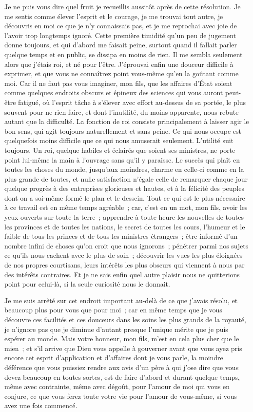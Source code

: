 \documentclass[french,twoside]{book} %
\begin{document}
Je ne puis vous dire quel fruit je recueillis aussitôt après de cette résolution. Je me sentis comme élever l’esprit et le courage, je me trouvai tout autre, je découvris en moi ce que je n’y connaissais pas, et je me reprochai avec joie de l’avoir trop longtemps ignoré. Cette première timidité qu’un peu de jugement donne toujours, et qui d’abord me faisait peine, surtout quand il fallait parler quelque temps et en public, se dissipa en moins de rien. Il me sembla seulement alors que j’étais roi, et né pour l’être. J’éprouvai enfin une douceur difficile à exprimer, et que vous ne connaîtrez point vous-même qu’en la goûtant comme moi. Car il ne faut pas vous imaginer, mon fils, que les affaires d’État soient comme quelques endroits obscurs et épineux des sciences qui vous auront peut-être fatigué, où l’esprit tâche à s’élever avec effort au-dessus de sa portée, le plus souvent pour ne rien faire, et dont l’inutilité, du moins apparente, nous rebute autant que la difficulté. La fonction de roi consiste principalement à laisser agir le bon sens, qui agit toujours naturellement et sans peine. Ce qui nous occupe est quelquefois moins difficile que ce qui nous amuserait seulement. L’utilité suit toujours. Un roi, quelque habiles et éclairés que soient ses ministres, ne porte point lui-même la main à l’ouvrage sans qu’il y paraisse. Le succès qui plaît en toutes les choses du monde, jusqu’aux moindres, charme en celle-ci comme en la plus grande de toutes, et nulle satisfaction n’égale celle de remarquer chaque jour quelque progrès à des entreprises glorieuses et hautes, et à la félicité des peuples dont on a soi-même formé le plan et le dessein. Tout ce qui est le plus nécessaire à ce travail est en même temps agréable ; car, c’est en un mot, mon fils, avoir les yeux ouverts sur toute la terre ; apprendre à toute heure les nouvelles de toutes les provinces et de toutes les nations, le secret de toutes les cours, l’humeur et le faible de tous les princes et de tous les ministres étrangers ; être informé d’un nombre infini de choses qu’on croit que nous ignorons ; pénétrer parmi nos sujets ce qu’ils nous cachent avec le plus de soin ; découvrir les vues les plus éloignées de nos propres courtisans, leurs intérêts les plus obscurs qui viennent à nous par des intérêts contraires. Et je ne sais enfin quel autre plaisir nous ne quitterions point pour celui-là, si la seule curiosité nous le donnait.\par
Je me suis arrêté sur cet endroit important au-delà de ce que j’avais résolu, et beaucoup plus pour vous que pour moi ; car en même temps que je vous découvre ces facilités et ces douceurs dans les soins les plus grands de la royauté, je n’ignore pas que je diminue d’autant presque l’unique mérite que je puis espérer au monde. Mais votre honneur, mon fils, m’est en cela plus cher que le mien ; et s’il arrive que Dieu vous appelle à gouverner avant que vous ayez pris encore cet esprit d’application et d’affaires dont je vous parle, la moindre déférence que vous puissiez rendre aux avis d’un père à qui j’ose dire que vous devez beaucoup en toutes sortes, est de faire d’abord et durant quelque temps, même avec contrainte, même avec dégoût, pour l’amour de moi qui vous en conjure, ce que vous ferez toute votre vie pour l’amour de vous-même, si vous avez une fois commencé.\par
\end{document}
